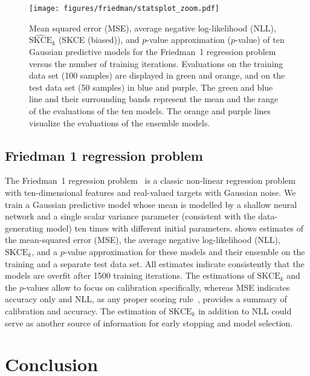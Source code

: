 \documentclass{article}
\begin{document}
\begin{figure}[!hbtp]
    \centering
    \texttt{[image: figures/friedman/statsplot\_zoom.pdf]}
    \caption{Mean squared error (MSE), average negative log-likelihood (NLL),
    $\widehat{\mathrm{SKCE}}_k$ (SKCE (biased)), and $p$-value approximation ($p$-value) of
    ten Gaussian predictive models for the Friedman~1 regression problem versus
    the number of training iterations.
    Evaluations on the training data set (100 samples) are displayed in green
    and orange, and on the test data set (50 samples) in blue and purple.
    The green and blue line and their surrounding bands represent
    the mean and the range of the evaluations of the ten models. The orange and
    purple lines visualize the evaluations of the ensemble models.}%
    \label{fig:friedman1_zoom}
    \vspace{-\baselineskip}
\end{figure}

\subsection{Friedman 1 regression problem}

The Friedman~1 regression problem~\citep{Friedman1979,Friedman1983,Friedman1991}
is a classic non-linear regression problem with ten-dimensional features and
real-valued targets with Gaussian noise. We train a Gaussian predictive model
whose mean is modelled by a shallow neural network and %
a single scalar
variance
parameter (consistent with the data-generating model) ten times
with different initial parameters.  shows estimates of the
mean-squared error (MSE),
the average negative log-likelihood (NLL), $\mathrm{SKCE}_k$, and a $p$-value
approximation for these models and their ensemble on the training and a separate
test data set.
All estimates indicate consistently
that the models are overfit after 1500 training iterations. The estimations of
$\mathrm{SKCE}_k$ and the $p$-values allow to focus on calibration specifically,
whereas MSE indicates accuracy only and NLL, as any proper scoring rule~\citep{Broecker2009}, provides a summary of calibration and accuracy. The estimation
of $\mathrm{SKCE}_k$ in addition to NLL could serve as another source of information
for early stopping and model selection.

\section{Conclusion}
\end{document}

